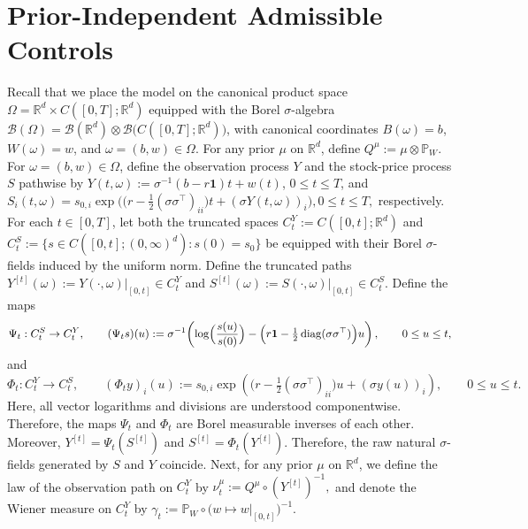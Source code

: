 \documentclass[11pt]{article}
\theoremstyle{definition}
\begin{document}
 
 



    

    


    


 


{
\section{Prior-Independent Admissible Controls}\label{sec:priorind}
Recall that we place the model on the canonical product space
$\Omega=\mathbb{R}^d\times C([0,T];\mathbb{R}^d)$ equipped with the Borel
$\sigma$-algebra
$\mathcal{B}(\Omega)
=
\mathcal B(\mathbb R^d)\otimes
\mathcal B\!\bigl(C([0,T];\mathbb R^d)\bigr)$,
with canonical coordinates $B(\omega)=b$, $W(\omega)=w$, and
$\omega=(b,w)\in\Omega.$
For any prior $\mu$ on $\mathbb R^d$, define ${Q}^{\mu}:=\mu\otimes\mathbb{P}_W.$
For $\omega=(b,w)\in\Omega$, define the observation process $Y$ and the
stock-price process $S$ pathwise by
$Y(t,\omega):=\sigma^{-1}(b-r\mathbf 1)t+w(t)$, $0\le t\le T$, and $S_i(t,\omega)
=
s_{0,i}\exp\!\Big(
\bigl(r-\tfrac12(\sigma\sigma^\top)_{ii}\bigr)t
+(\sigma Y(t,\omega))_i
\Big), 0\le t\le T,$
respectively. For each $t\in[0,T]$, let both the truncated spaces $C_t^Y:=C([0,t];\mathbb R^d)$
and $C_t^S
:=
\bigl\{
s\in C([0,t];(0,\infty)^d):s(0)=s_0
\bigr\}$
be equipped with their Borel $\sigma$-fields induced by the uniform norm.
Define the truncated paths $Y^{[t]}(\omega)
:=
Y(\cdot,\omega)\big|_{[0,t]}\in C_t^Y$
and $S^{[t]}(\omega)
:=
S(\cdot,\omega)\big|_{[0,t]}\in C_t^S.$
Define the maps
\[
\Psi_t:C_t^S\to C_t^Y,
\qquad
(\Psi_t s)(u)
:=
\sigma^{-1}\!\left(
\log\Bigl(\frac{s(u)}{s(0)}\Bigr)
-
\Bigl(
r\mathbf 1-\tfrac12\operatorname{diag}(\sigma\sigma^\top)
\Bigr)u
\right),
\qquad 0\le u\le t,
\]
and
\[
\Phi_t:C_t^Y\to C_t^S,
\qquad
(\Phi_t y)_i(u)
:=
s_{0,i}\exp\!\left(
\bigl(r-\tfrac12(\sigma\sigma^\top)_{ii}\bigr)u
+(\sigma y(u))_i
\right),
\qquad 0\le u\le t.
\]
Here, all vector logarithms and divisions are understood componentwise.
Therefore, the maps $\Psi_t$ and $\Phi_t$ are Borel measurable inverses
of each other. Moreover,
$Y^{[t]}=\Psi_t(S^{[t]})$ and
$S^{[t]}=\Phi_t(Y^{[t]})$.
Therefore, the raw natural $\sigma$-fields generated by $S$ and $Y$
coincide.
Next, for any prior $\mu$ on $\mathbb R^d$, we define the law of the
observation path on $C_t^Y$ by $\nu_t^\mu
:=
{Q}^{\mu}\circ(Y^{[t]})^{-1},$
and denote the Wiener measure on $C_t^Y$ by $\gamma_t
:=
\mathbb{P}_W
\circ
\bigl(w\mapsto w|_{[0,t]}\bigr)^{-1}$.
}
\end{document}
